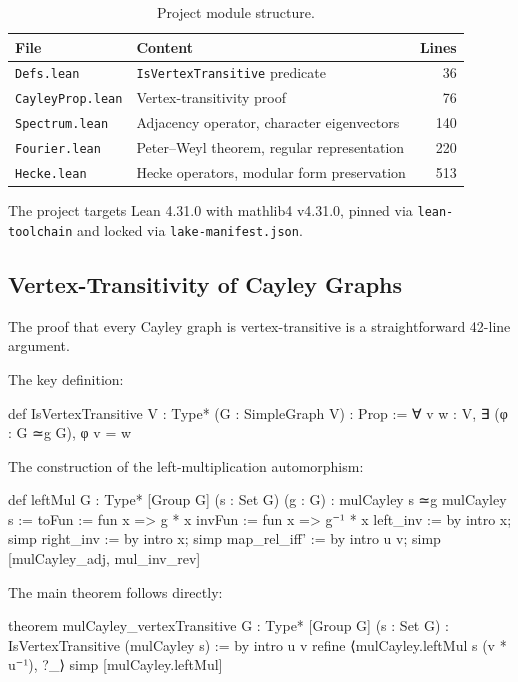 \documentclass[11pt]{article}
\theoremstyle{plain}
\theoremstyle{definition}
\theoremstyle{remark}
\begin{document}
\begin{table}[H]
\centering
\begin{tabular}{llr}
\toprule
\textbf{File} & \textbf{Content} & \textbf{Lines} \\
\midrule
\texttt{Defs.lean} & \texttt{IsVertexTransitive} predicate & 36 \\
\texttt{CayleyProp.lean} & Vertex-transitivity proof & 76 \\
\texttt{Spectrum.lean} & Adjacency operator, character eigenvectors & 140 \\
\texttt{Fourier.lean} & Peter--Weyl theorem, regular representation & 220 \\
\texttt{Hecke.lean} & Hecke operators, modular form preservation & 513 \\
\bottomrule
\end{tabular}
\caption{Project module structure.}
\end{table}

The project targets Lean 4.31.0 with mathlib4 v4.31.0, pinned via \texttt{lean-toolchain} and locked via \texttt{lake-manifest.json}.

\subsection{Vertex-Transitivity of Cayley Graphs}

The proof that every Cayley graph is vertex-transitive is a straightforward 42-line argument.

The key definition:

\begin{lean}
def IsVertexTransitive {V : Type*} (G : SimpleGraph V) : Prop :=
  ∀ v w : V, ∃ (φ : G ≃g G), φ v = w
\end{lean}

The construction of the left-multiplication automorphism:

\begin{lean}
def leftMul {G : Type*} [Group G] (s : Set G) (g : G) :
    mulCayley s ≃g mulCayley s :=
  { toFun := fun x => g * x
    invFun := fun x => g⁻¹ * x
    left_inv := by intro x; simp
    right_inv := by intro x; simp
    map_rel_iff' := by
      intro u v; simp [mulCayley_adj, mul_inv_rev] }
\end{lean}

The main theorem follows directly:

\begin{lean}
theorem mulCayley_vertexTransitive {G : Type*} [Group G] (s : Set G) :
    IsVertexTransitive (mulCayley s) := by
  intro u v
  refine ⟨mulCayley.leftMul s (v * u⁻¹), ?_⟩
  simp [mulCayley.leftMul]
\end{lean}
\end{document}
